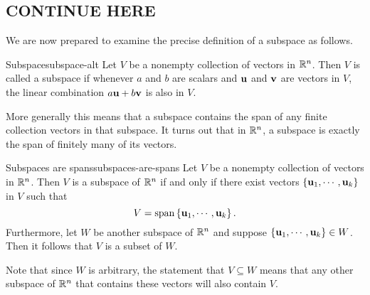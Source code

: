 \newpage
\subsection{CONTINUE HERE}

We are now prepared to examine the precise definition of a subspace as
follows.

\begin{definition}{Subspace}{subspace-alt}
  Let $V$ be a nonempty collection of vectors in $\mathbb{R}^{n}$. Then $V$ is
  called a subspace if whenever $a$
  and $b$ are scalars and $\mbox{\bf u}$ and $\mbox{\bf v}$ are vectors in
  $V$, the linear combination $a \mbox{\bf u}+ b \mbox{\bf v}$ is also in $V$.
\end{definition}

More generally this means that a subspace contains the span of any
finite collection vectors in that subspace. It turns out that in
$\mathbb{R}^{n}$, a subspace is exactly the span of finitely many of its
vectors.

\begin{theorem}{Subspaces are spans}{subspaces-are-spans}
  Let $V$ be a nonempty collection of vectors in $\mathbb{R}^{n}$. Then $V$ is
  a subspace of $\mathbb{R}^{n}$ if and only if there exist vectors
  $\left\{\mbox{\bf u}_{1},\cdots ,\mbox{\bf u}_{k}\right\}$ in $V$ such that
  \begin{equation*}
    V= \sspan\set{\vect{u}_{1},\cdots ,\vect{u}_{k}}. 
  \end{equation*}
   Furthermore, let $W$ be another subspace of
  $\mathbb{R}^n$ and suppose $\left\{\mbox{\bf u}_{1},\cdots ,\mbox{\bf u}_{k}\right\} \in
  W$. Then it follows that $V$ is a subset of $W$.
\end{theorem}

Note that since $W$ is arbitrary, the statement that $V \subseteq W$
means that any other subspace of $\mathbb{R}^n$ that contains these vectors
will also contain $V$.

